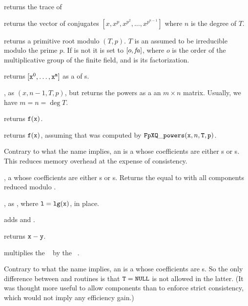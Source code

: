  returns the trace of 

 returns the vector of conjugates
$[x,x^p,x^{p^2},\ldots,x^{p^{n-1}}]$ where $n$ is the degree of $T$.

 returns a primitive root modulo
$(T,p)$. $T$ is an  assumed to be irreducible modulo the prime
$p$. If  is not  it is set to $[o,\hbox{\it fa\/}]$, where $o$ is
the order of the multiplicative group of the finite field, and  is
its factorization.

 returns $[{\tt x}^0,
\dots, {\tt x}^{\tt n}]$ as a  of s.

, as
$(x, n-1, T, p)$, but returns the powers as a an
$m\times n$ matrix. Usually, we have $m = n = \deg T$.

 returns
${\tt f}({\tt x})$.

 returns
${\tt f}({\tt x})$, assuming that  was computed by
${\tt FpXQ\_powers}({\tt x}, n, {\tt T}, {\tt p})$.

Contrary to what the name implies, an  is a  whose
coefficients are either s or s. This reduces memory
overhead at the expense of consistency.

,  a  whose coefficients are
either s or s. Returns the  equal to  with
all components reduced modulo .

, as , where
${\tt l} = {\tt lg(x)}$, in place.

 adds  and .

 returns ${\tt x}-{\tt y}$.

 multiplies the ~
by the ~.

Contrary to what the name implies, an  is a  whose
coefficients are s. So the only difference between  and
 routines is that ${\tt T} = {\tt NULL}$ is not allowed in the
latter. (It was thought more useful to allow  components than to
enforce strict consistency, which would not imply any efficiency gain.)

